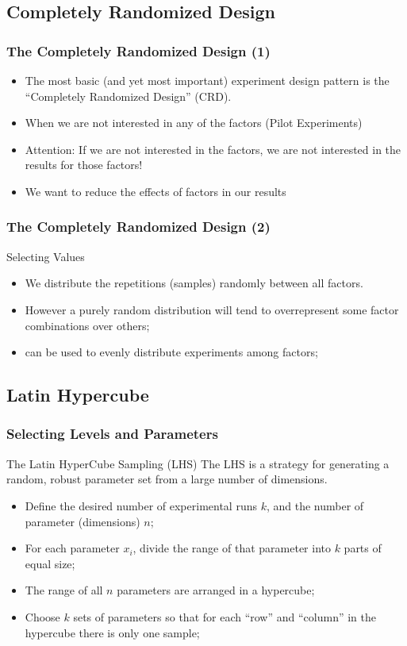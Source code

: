 \documentclass[10pt]{beamer}
\begin{document}
\subsection{Completely Randomized Design}
\begin{frame}
  \frametitle{The Completely Randomized Design (1)} 

  \begin{itemize}
  \item The most basic (and yet most important) experiment design pattern is
    the ``Completely Randomized Design'' (CRD).
  \item When we are not interested in any of the factors (Pilot Experiments)
  \item \alert{Attention: If we are not interested in the factors, we
        are not interested in the results for those factors!}
  \item We want to reduce the effects of factors in our results
  \end{itemize}
\end{frame}

\begin{frame}
  \frametitle{The Completely Randomized Design (2)}
  \begin{block}{Selecting Values}
    \begin{itemize}
    \item We distribute the repetitions (samples) randomly between all
      factors.
    \item \alert{However} a purely random distribution will tend to
      overrepresent some factor combinations over others;
    \item {} can be used to evenly
      distribute experiments among factors;
    \end{itemize}
  \end{block}
\end{frame}

\subsection{Latin Hypercube}

\begin{frame}
  \frametitle{Selecting Levels and Parameters}
  \begin{block}{The Latin HyperCube Sampling (LHS)}
    The LHS is a strategy for generating a random, robust parameter
    set from a large number of dimensions.
  \end{block}
  \begin{itemize}
  \item Define the desired number of experimental runs $k$, and the
    number of parameter (dimensions) $n$;
  \item For each parameter $x_i$, divide the range of that parameter
    into $k$ parts of equal size;
  \item The range of all $n$ parameters are arranged in a hypercube;
  \item Choose $k$ sets of parameters so that for each ``row'' and
    ``column'' in the hypercube there is only one sample;
  \end{itemize}
\end{frame}
\end{document}
